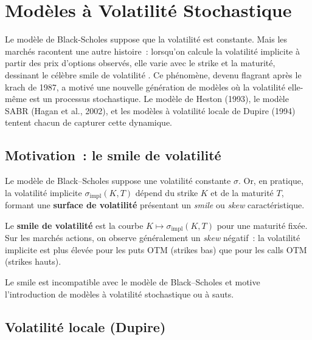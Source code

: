 \chapter{Mod\`eles \`a Volatilit\'e Stochastique}
\label{ch:volatilite}

Le mod\`ele de Black-Scholes suppose que la volatilit\'e est constante. Mais les march\'es racontent une autre histoire~: lorsqu'on calcule la volatilit\'e implicite \`a partir des prix d'options observ\'es, elle varie avec le strike et la maturit\'e, dessinant le c\'el\`ebre \og smile de volatilit\'e \fg. Ce ph\'enom\`ene, devenu flagrant apr\`es le krach de 1987, a motiv\'e une nouvelle g\'en\'eration de mod\`eles o\`u la volatilit\'e elle-m\^eme est un processus stochastique. Le mod\`ele de Heston (1993), le mod\`ele SABR (Hagan et al., 2002), et les mod\`eles \`a volatilit\'e locale de Dupire (1994) tentent chacun de capturer cette dynamique.

\section{Motivation~: le smile de volatilit\'e}

Le mod\`ele de Black--Scholes suppose une volatilit\'e constante $\sigma$.
Or, en pratique, la volatilit\'e implicite $\sigma_{\text{impl}}(K,T)$
d\'epend du strike $K$ et de la maturit\'e $T$, formant une \textbf{surface
de volatilit\'e} pr\'esentant un \textit{smile} ou \textit{skew} caract\'eristique.

\begin{definition}
Le \textbf{smile de volatilit\'e} est la courbe
$K \mapsto \sigma_{\text{impl}}(K, T)$ pour une maturit\'e fix\'ee.
Sur les march\'es actions, on observe g\'en\'eralement un \textit{skew}
n\'egatif~: la volatilit\'e implicite est plus \'elev\'ee pour les puts
OTM (strikes bas) que pour les calls OTM (strikes hauts).
\end{definition}

\begin{remarque}
Le smile est incompatible avec le mod\`ele de Black--Scholes et motive
l'introduction de mod\`eles \`a volatilit\'e stochastique ou \`a sauts.
\end{remarque}

\section{Volatilit\'e locale (Dupire)}

